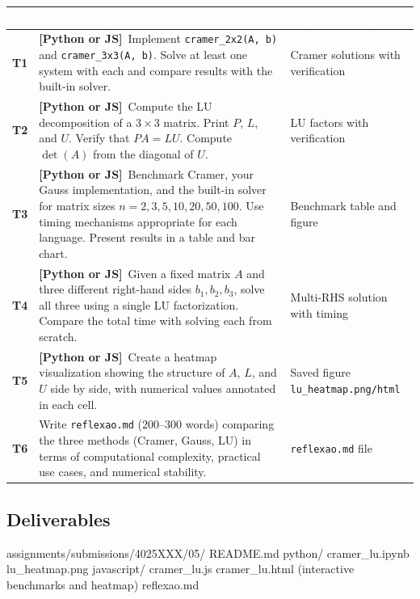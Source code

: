 \documentclass[a4paper,11pt]{article}
\newcommand{\bothlabel}{\textcolor{ippblue}{\textbf{[Python or JS]}}}
\begin{document}
\renewcommand{\arraystretch}{1.3}
\begin{tabularx}{\textwidth}{
  >{\centering\bfseries\cellcolor{lightblue}}p{0.8cm}
  X
  p{3.5cm}
}
\toprule
\rowcolor{ippblue}
\textcolor{white}{\#} & \textcolor{white}{\textbf{Task Description}} & \textcolor{white}{\textbf{Expected Output}} \\
\midrule
T1 & \bothlabel\ Implement \texttt{cramer\_2x2(A, b)} and \texttt{cramer\_3x3(A, b)}. Solve at least one system with each and compare results with the built-in solver. & Cramer solutions with verification \\
\rowcolor{lightgray}
T2 & \bothlabel\ Compute the LU decomposition of a $3 \times 3$ matrix. Print $P$, $L$, and $U$. Verify that $PA = LU$. Compute $\det(A)$ from the diagonal of $U$. & LU factors with verification \\
T3 & \bothlabel\ Benchmark Cramer, your Gauss implementation, and the built-in solver for matrix sizes $n = 2, 3, 5, 10, 20, 50, 100$. Use timing mechanisms appropriate for each language. Present results in a table and bar chart. & Benchmark table and figure \\
\rowcolor{lightgray}
T4 & \bothlabel\ Given a fixed matrix $A$ and three different right-hand sides $b_1, b_2, b_3$, solve all three using a single LU factorization. Compare the total time with solving each from scratch. & Multi-RHS solution with timing \\
T5 & \bothlabel\ Create a heatmap visualization showing the structure of $A$, $L$, and $U$ side by side, with numerical values annotated in each cell. & Saved figure \texttt{lu\_heatmap.png/html} \\
\rowcolor{lightgray}
T6 & Write \texttt{reflexao.md} (200--300 words) comparing the three methods (Cramer, Gauss, LU) in terms of computational complexity, practical use cases, and numerical stability. & \texttt{reflexao.md} file \\
\bottomrule
\end{tabularx}

\subsection{Deliverables}

\begin{code}
assignments/submissions/4025XXX/05/
  README.md
  python/
    cramer_lu.ipynb
    lu_heatmap.png
  javascript/
    cramer_lu.js
    cramer_lu.html              (interactive benchmarks and heatmap)
  reflexao.md
\end{code}
\end{document}
